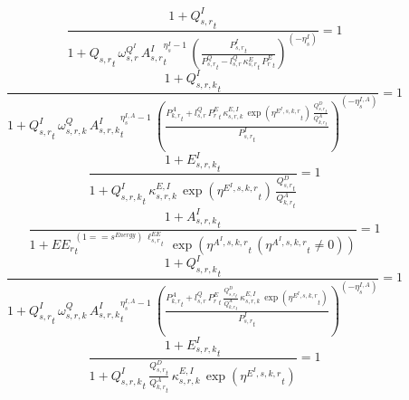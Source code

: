 \noindent[name= `regional sector demand for intermediate composite 1 1']
\begin{dmath}
\frac{1+{{Q^{I}_{s,r}}}_{t}}{1+{{Q_{s,r}}}_{t}\, {{\omega^{Q^{I}}_{s,r}}}\, {{A^{I}_{s,r}}}_{t}^{{{\eta^{I}_{s}}}-1}\, \left(\frac{{{P^{I}_{s,r}}}_{t}}{{{P^Q_{s,r}}}_{t}-{{l^{Q}_{s,r}}}\, {{\kappa^{E}_{s,r}}}_{t}\, {{P^E_r}}_{t}}\right)^{\left(-{{\eta^{I}_{s}}}\right)}}=1
\end{dmath}
\noindent[name= `regional sector demand for intermediates from aggregate sector 1 1 1']
\begin{dmath}
\frac{1+{{Q^{I}_{s,r,k}}}_{t}}{1+{{Q^{I}_{s,r}}}_{t}\, {{\omega^{Q}_{s,r,k}}}\, {{A^{I}_{s,r,k}}}_{t}^{{{\eta^{I,A}_{s}}}-1}\, \left(\frac{{{P^{A}_{k,r}}}_{t}+{{l^{Q}_{s,r}}}\, {{P^E_r}}_{t}\, {{\kappa^{E,I}_{s,r,k}}}\, \exp\left({{\eta^{E^{I},s,k,r}}}_{t}\right)\, \frac{{{Q^{D}_{s,r}}}_{t}}{{{Q^{A}_{k,r}}}_{t}}}{{{P^{I}_{s,r}}}_{t}}\right)^{\left(-{{\eta^{I,A}_{s}}}\right)}}=1
\end{dmath}
\noindent[name= `regional emissions caused by using intermediates from aggregate sector 1 1 1']
\begin{dmath}
\frac{1+{{E^I_{s,r,k}}}_{t}}{1+{{Q^{I}_{s,r,k}}}_{t}\, {{\kappa^{E,I}_{s,r,k}}}\, \exp\left({{\eta^{E^{I},s,k,r}}}_{t}\right)\, \frac{{{Q^{D}_{s,r}}}_{t}}{{{Q^{A}_{k,r}}}_{t}}}=1
\end{dmath}
\noindent[name= `productivity of intermediates in subsector 1 region 1 from sector 1']
\begin{dmath}
\frac{1+{{A^{I}_{s,r,k}}}_{t}}{1+{{EE_r}}_{t}^{\left(1=={{s^{Energy}}}\right)\, {{\ell^{EE}_{s,r}}}_{t}}\, \exp\left({{\eta^{A^{I},s,k,r}}}_{t}\, \left({{\eta^{A^{I},s,k,r}}}_{t}\neq 0\right)\right)}=1
\end{dmath}
\noindent[name= `regional sector demand for intermediates from aggregate sector 1 1 2']
\begin{dmath}
\frac{1+{{Q^{I}_{s,r,k}}}_{t}}{1+{{Q^{I}_{s,r}}}_{t}\, {{\omega^{Q}_{s,r,k}}}\, {{A^{I}_{s,r,k}}}_{t}^{{{\eta^{I,A}_{s}}}-1}\, \left(\frac{{{P^{A}_{k,r}}}_{t}+{{l^{Q}_{s,r}}}\, {{P^E_r}}_{t}\, \frac{{{Q^{D}_{s,r}}}_{t}}{{{Q^{A}_{k,r}}}_{t}}\, {{\kappa^{E,I}_{s,r,k}}}\, \exp\left({{\eta^{E^{I},s,k,r}}}_{t}\right)}{{{P^{I}_{s,r}}}_{t}}\right)^{\left(-{{\eta^{I,A}_{s}}}\right)}}=1
\end{dmath}
\noindent[name= `regional emissions caused by using intermediates from aggregate sector 1 1 2']
\begin{dmath}
\frac{1+{{E^I_{s,r,k}}}_{t}}{1+{{Q^{I}_{s,r,k}}}_{t}\, \frac{{{Q^{D}_{s,r}}}_{t}}{{{Q^{A}_{k,r}}}_{t}}\, {{\kappa^{E,I}_{s,r,k}}}\, \exp\left({{\eta^{E^{I},s,k,r}}}_{t}\right)}=1
\end{dmath}
